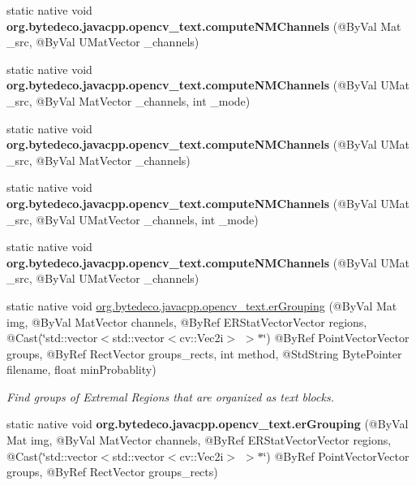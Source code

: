 \begin{DoxyCompactItemize}
static native void {\bfseries org.\+bytedeco.\+javacpp.\+opencv\+\_\+text.\+compute\+N\+M\+Channels} (@By\+Val Mat \+\_\+src, @By\+Val U\+Mat\+Vector \+\_\+channels)
\item 
\mbox{\label{group__text__detect_gaec7559b20b825c35eef44c2a0e034033}} 
static native void {\bfseries org.\+bytedeco.\+javacpp.\+opencv\+\_\+text.\+compute\+N\+M\+Channels} (@By\+Val U\+Mat \+\_\+src, @By\+Val Mat\+Vector \+\_\+channels, int \+\_\+mode)
\item 
\mbox{\label{group__text__detect_ga033d37092f19e10e6652f9cf8cf74d3b}} 
static native void {\bfseries org.\+bytedeco.\+javacpp.\+opencv\+\_\+text.\+compute\+N\+M\+Channels} (@By\+Val U\+Mat \+\_\+src, @By\+Val Mat\+Vector \+\_\+channels)
\item 
\mbox{\label{group__text__detect_ga8385a36c380734465f04a31669100673}} 
static native void {\bfseries org.\+bytedeco.\+javacpp.\+opencv\+\_\+text.\+compute\+N\+M\+Channels} (@By\+Val U\+Mat \+\_\+src, @By\+Val U\+Mat\+Vector \+\_\+channels, int \+\_\+mode)
\item 
\mbox{\label{group__text__detect_ga5ec53e533b6045b6247ffd37ff2db041}} 
static native void {\bfseries org.\+bytedeco.\+javacpp.\+opencv\+\_\+text.\+compute\+N\+M\+Channels} (@By\+Val U\+Mat \+\_\+src, @By\+Val U\+Mat\+Vector \+\_\+channels)
\item 
static native void \hyperlink{group__text__detect_ga3198c558c08dac61bce863d430bf2da6}{org.\+bytedeco.\+javacpp.\+opencv\+\_\+text.\+er\+Grouping} (@By\+Val Mat img, @By\+Val Mat\+Vector channels, @By\+Ref E\+R\+Stat\+Vector\+Vector regions, @Cast(\char`\"{}std\+::vector$<$std\+::vector$<$cv\+::\+Vec2i$>$ $>$$\ast$\char`\"{}) @By\+Ref Point\+Vector\+Vector groups, @By\+Ref Rect\+Vector groups\+\_\+rects, int method, @Std\+String Byte\+Pointer filename, float min\+Probablity)
\begin{DoxyCompactList}\small\item\em Find groups of Extremal Regions that are organized as text blocks. \end{DoxyCompactList}\item 
\mbox{\label{group__text__detect_gabac27e6b96790d31ba270d3ed311cc60}} 
static native void {\bfseries org.\+bytedeco.\+javacpp.\+opencv\+\_\+text.\+er\+Grouping} (@By\+Val Mat img, @By\+Val Mat\+Vector channels, @By\+Ref E\+R\+Stat\+Vector\+Vector regions, @Cast(\char`\"{}std\+::vector$<$std\+::vector$<$cv\+::\+Vec2i$>$ $>$$\ast$\char`\"{}) @By\+Ref Point\+Vector\+Vector groups, @By\+Ref Rect\+Vector groups\+\_\+rects)

\end{DoxyCompactItemize}
